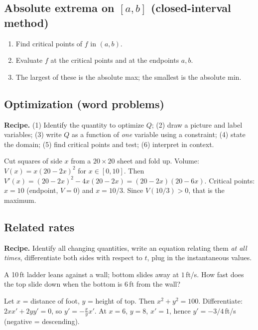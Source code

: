 \subsection{Absolute extrema on $[a,b]$ (closed-interval method)}
\begin{enumerate}[leftmargin=*,nosep]
  \item Find critical points of $f$ in $(a,b)$.
  \item Evaluate $f$ at the critical points and at the endpoints $a,b$.
  \item The largest of these is the absolute max; the smallest is the absolute min.
\end{enumerate}

\subsection{Optimization (word problems)}
\textbf{Recipe.} (1) Identify the quantity to optimize $Q$; (2) draw a picture and label
variables; (3) write $Q$ as a function of \emph{one} variable using a constraint;
(4) state the domain; (5) find critical points and test; (6) interpret in context.

\begin{example}
Cut squares of side $x$ from a $20\times 20$ sheet and fold up. Volume:
$V(x) = x(20 - 2x)^2$ for $x \in [0,10]$. Then
$V'(x) = (20-2x)^2 - 4x(20-2x) = (20-2x)(20-6x)$. Critical points: $x = 10$ (endpoint, $V=0$)
and $x = 10/3$. Since $V(10/3) > 0$, that is the maximum.
\end{example}

\subsection{Related rates}
\textbf{Recipe.} Identify all changing quantities, write an equation relating them
\emph{at all times}, differentiate both sides with respect to $t$, plug in the instantaneous values.

\begin{example}
A 10\,ft ladder leans against a wall; bottom slides away at $1$\,ft/s. How fast does the top
slide down when the bottom is $6$\,ft from the wall?

Let $x$ = distance of foot, $y$ = height of top. Then $x^2 + y^2 = 100$. Differentiate:
$2x x' + 2y y' = 0$, so $y' = -\tfrac{x}{y} x'$. At $x = 6$, $y = 8$, $x' = 1$, hence
$y' = -3/4$\,ft/s (negative = descending).
\end{example}

